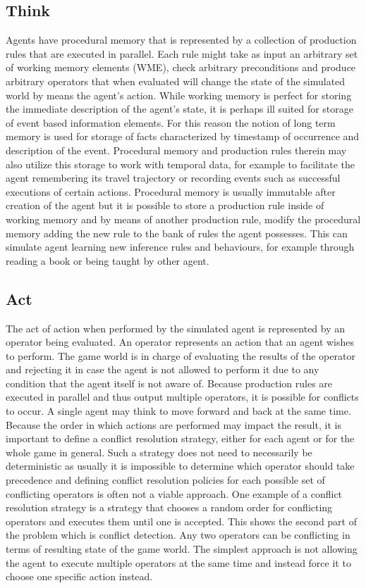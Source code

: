 \subsection{Think}

Agents have procedural memory that is represented by a collection of production rules that are executed in parallel.
Each rule might take as input an arbitrary set of working memory elements (WME), check arbitrary preconditions and produce arbitrary operators that when evaluated will change the state of the simulated world by means the agent's action.
While working memory is perfect for storing the immediate description of the agent's state, it is perhaps ill suited for storage of event based information elements.
For this reason the notion of long term memory is used for storage of facts characterized by timestamp of occurrence and description of the event.
Procedural memory and production rules therein may also utilize this storage to work with temporal data, for example to facilitate the agent remembering its travel trajectory or recording events such as successful executions of certain actions.
Procedural memory is usually immutable after creation of the agent but it is possible to store a production rule inside of working memory and by means of another production rule, modify the procedural memory adding the new rule to the bank of rules the agent possesses.
This can simulate agent learning new inference rules and behaviours, for example through reading a book or being taught by other agent.

\subsection{Act}

The act of action when performed by the simulated agent is represented by an operator being evaluated.
An operator represents an action that an agent wishes to perform.
The game world is in charge of evaluating the results of the operator and rejecting it in case the agent is not allowed to perform it due to any condition that the agent itself is not aware of.
Because production rules are executed in parallel and thus output multiple operators, it is possible for conflicts to occur.
A single agent may think to move forward and back at the same time.
Because the order in which actions are performed may impact the result, it is important to define a conflict resolution strategy, either for each agent or for the whole game in general.
Such a strategy does not need to necessarily be deterministic as usually it is impossible to determine which operator should take precedence and defining conflict resolution policies for each possible set of conflicting operators is often not a viable approach.
One example of a conflict resolution strategy is a strategy that chooses a random order for conflicting operators and executes them until one is accepted.
This shows the second part of the problem which is conflict detection.
Any two operators can be conflicting in terms of resulting state of the game world.
The simplest approach is not allowing the agent to execute multiple operators at the same time and instead force it to choose one specific action instead.


